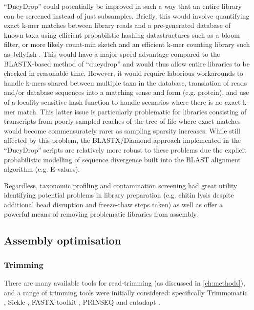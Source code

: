 ``DueyDrop'' could potentially be improved in such a way that an entire library can be screened instead of just subsamples.
Briefly, this would involve quantifying exact k-mer matches between library reads and a pre-generated database of known taxa
using efficient probabilstic hashing datastructures such as a bloom filter, or more likely count-min sketch and an efficient
k-mer counting library such as Jellyfish \citep{Marcais2011}.  This would have a major speed advantage compared to the BLASTX-based method of ``dueydrop''
and would thus allow entire libraries to be checked in reasonable time.  However, it would require laborious workarounds to handle
k-mers shared between multiple taxa in the database, translation of reads and/or database sequences into a matching sense and form (e.g. protein),
and use of a locality-sensitive hash function to handle scenarios where there is no exact k-mer match. This latter issue is particularly
problematic for libraries consisting of transcripts from poorly sampled reaches of the tree of life where exact matches would become
commensurately rarer as sampling sparsity increases.  
While still affected by this problem, the BLASTX/Diamond approach implemented in the ``DueyDrop'' scripts are relatively more robust to these
problems due the explicit probabilistic modelling of sequence divergence built into the BLAST alignment algorithm (e.g. E-values).

Regardless, taxonomic profiling and contamination screening had great utility identifying potential problems in library preparation (e.g. chitin lysis despite
additional bead disruption and freeze-thaw steps taken) as well as offer a powerful means of removing problematic libraries from assembly.





\subsection{Assembly optimisation}

\subsubsection{Trimming}



There are many available tools for read-trimming (as discussed in \ref{ch:methods}),
and a range of trimming tools were initially
considered: specifically Trimmomatic \citep{Bolger2014a}, Sickle \citep{JoshiGitHub}, FASTX-toolkit \citep{gordon2010fastx},
PRINSEQ \citep{Schmieder2011} and cutadapt \citep{martin2011cutadapt}. 

